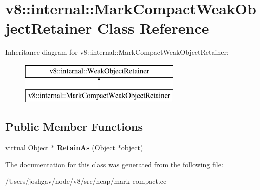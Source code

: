 \hypertarget{classv8_1_1internal_1_1_mark_compact_weak_object_retainer}{}\section{v8\+:\+:internal\+:\+:Mark\+Compact\+Weak\+Object\+Retainer Class Reference}
\label{classv8_1_1internal_1_1_mark_compact_weak_object_retainer}
Inheritance diagram for v8\+:\+:internal\+:\+:Mark\+Compact\+Weak\+Object\+Retainer\+:\begin{figure}[H]
\begin{center}
\leavevmode
\includegraphics[height=2.000000cm]{classv8_1_1internal_1_1_mark_compact_weak_object_retainer}
\end{center}
\end{figure}
\subsection*{Public Member Functions}
\begin{DoxyCompactItemize}
\item 
virtual \hyperlink{classv8_1_1internal_1_1_object}{Object} $\ast$ {\bfseries Retain\+As} (\hyperlink{classv8_1_1internal_1_1_object}{Object} $\ast$object)\hypertarget{classv8_1_1internal_1_1_mark_compact_weak_object_retainer_a910af6f613624e6ced737ff75b2ad95d}{}\label{classv8_1_1internal_1_1_mark_compact_weak_object_retainer_a910af6f613624e6ced737ff75b2ad95d}

\end{DoxyCompactItemize}


The documentation for this class was generated from the following file\+:\begin{DoxyCompactItemize}
\item 
/\+Users/joshgav/node/v8/src/heap/mark-\/compact.\+cc\end{DoxyCompactItemize}
